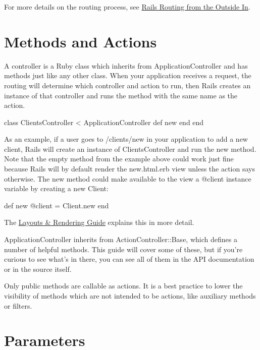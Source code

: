\documentclass[10pt]{book}
\newenvironment{code}{%
  \scriptsize
    \verbatim
}{%
    \endverbatim
    \newline
}
\begin{document}
For more details on the routing process, see \href{http://guides.rubyonrails.org/routing.html}{Rails Routing from the Outside In}.

\section{ Methods and Actions}

A controller is a Ruby class which inherits from ApplicationController  and has methods just like any other class. When your application  receives a request, the routing will determine which controller and  action to run, then Rails creates an instance of that controller and  runs the method with the same name as the action.
\begin{code}
class ClientsController < ApplicationController
  def new
  end
end
\end{code}

As an example, if a user goes to /clients/new in your application to add a new client, Rails will create an instance of ClientsController and run the new method. Note that the empty method from the example above could work just fine because Rails will by default render the new.html.erb view unless the action says otherwise. The new method could make available to the view a @client instance variable by creating a new Client:
\begin{code}
def new
  @client = Client.new
end
\end{code}

The \href{http://guides.rubyonrails.org/layouts_and_rendering.html}{Layouts \& Rendering Guide} explains this in more detail.

ApplicationController inherits from ActionController::Base,  which defines a number of helpful methods. This guide will cover some  of these, but if you’re curious to see what’s in there, you can see all  of them in the API documentation or in the source itself.

Only public methods are callable as actions. It is a best practice to  lower the visibility of methods which are not intended to be actions,  like auxiliary methods or filters.

\section{ Parameters}
\end{document}
